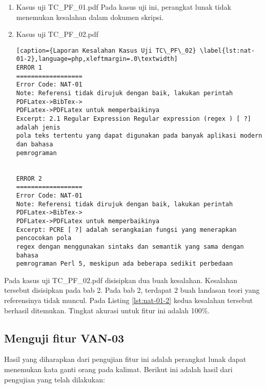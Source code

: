\begin{enumerate}
	\item Kasus uji TC\_PF\_01.pdf \newline
	Pada kasus uji ini, perangkat lunak tidak menemukan kesalahan dalam dokumen skripsi.
	
	\item Kasus uji TC\_PF\_02.pdf
	
\begin{lstlisting}[caption={Laporan Kesalahan Kasus Uji TC\_PF\_02}	\label{lst:nat-01-2},language=php,xleftmargin=.0\textwidth]
ERROR 1
==================
Error Code: NAT-01
Note: Referensi tidak dirujuk dengan baik, lakukan perintah PDFLatex->BibTex->
PDFLatex->PDFLatex untuk memperbaikinya
Excerpt: 2.1 Regular Expression Regular expression (regex ) [ ?] adalah jenis 
pola teks tertentu yang dapat digunakan pada banyak aplikasi modern dan bahasa 
pemrograman


ERROR 2
==================
Error Code: NAT-01
Note: Referensi tidak dirujuk dengan baik, lakukan perintah PDFLatex->BibTex->
PDFLatex->PDFLatex untuk memperbaikinya
Excerpt: PCRE [ ?] adalah serangkaian fungsi yang menerapkan pencocokan pola 
regex dengan menggunakan sintaks dan semantik yang sama dengan bahasa 
pemrograman Perl 5, meskipun ada beberapa sedikit perbedaan
\end{lstlisting}
\end{enumerate}

Pada kasus uji TC\_PF\_02.pdf disisipkan dua buah kesalahan. Kesalahan tersebut disisipkan pada bab 2. Pada bab 2, terdapat 2 buah landasan teori yang referensinya tidak muncul. Pada Listing \ref{lst:nat-01-2} kedua kesalahan tersebut berhasil ditemukan. Tingkat akurasi untuk fitur ini adalah 100\%.

\subsection{Menguji fitur VAN-03}
Hasil yang diharapkan dari pengujian fitur ini adalah perangkat lunak dapat menemukan kata ganti orang pada kalimat. Berikut ini adalah hasil dari pengujian yang telah dilakukan:

